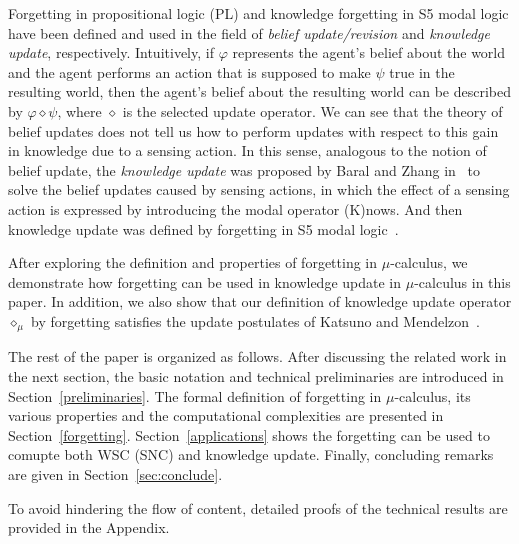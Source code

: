 \documentclass[runningheads]{llncs}
\begin{document}
Forgetting in propositional logic (PL) and knowledge forgetting in S5 modal logic have been defined and used in the field of \emph{belief update/revision} and \emph{knowledge update}, respectively\cite{DBLP:journals/ai/Lin01,lang2003propositional,su2004reasoning,baral2005knowledge,Zhang2009Knowledge}.
Intuitively, if $\varphi$ represents the agent's belief about the world and the agent performs an action that is supposed to make $\psi$ true in the resulting world, then the agent's belief about the resulting  world can be described by $\varphi \diamond \psi$, where $\diamond$ is the selected update operator.
We can see that the theory of belief updates does not tell us how to perform updates with  respect to this gain in knowledge due to a sensing action.
In this sense, analogous to the notion of belief update, the \emph{knowledge update} was proposed by Baral and Zhang in~\cite{baral2005knowledge} to solve the belief updates caused by sensing actions, in which the effect of a sensing action is expressed by introducing the modal operator (K)nows.
And then knowledge update was defined by forgetting in S5 modal logic~\cite{Zhang2009Knowledge}.


After exploring the definition and properties of forgetting in $\mu$-calculus, we demonstrate how forgetting can be used in knowledge update in $\mu$-calculus in this paper.
In addition, we also show that our definition of knowledge update operator $\diamond_{\mu}$ by forgetting satisfies the update postulates of  Katsuno and Mendelzon~\cite{katsuno91mendelzon}.

The rest of the paper is organized as follows. 
After discussing the related work in the next section, the basic notation and technical preliminaries are introduced in Section~\ref{preliminaries}. The formal definition of forgetting in $\mu$-calculus,  its various properties and the computational complexities are presented in Section~\ref{forgetting}.
Section~\ref{applications} shows the forgetting can be used to comupte both WSC (SNC) and knowledge update.
Finally, concluding remarks are given in Section~\ref{sec:conclude}.

To avoid hindering the flow of content, detailed proofs of the technical results are provided in the Appendix.
\end{document}
